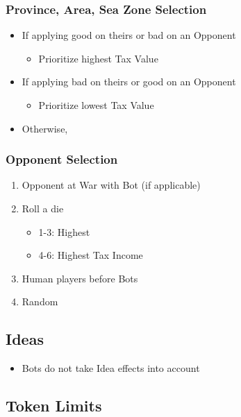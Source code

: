 \documentclass[10pt]{article}
\begin{document}
\subsubsection*{Province, Area, Sea Zone Selection}
\begin{itemize}
	\item If applying good on theirs or bad on an Opponent
	\begin{itemize}
		\item Prioritize highest Tax Value
	\end{itemize}
	\item If applying bad on theirs or good on an Opponent
	\begin{itemize}
		\item Prioritize lowest Tax Value
	\end{itemize}
	\item Otherwise, \az
\end{itemize}

\subsubsection*{Opponent Selection}
\begin{enumerate}
	\item Opponent at War with Bot (if applicable)
	\item Roll a die
	\begin{itemize}
		\item 1-3: Highest \prestige
		\item 4-6: Highest Tax Income
	\end{itemize}
	\item Human players before Bots
	\item Random	
\end{enumerate}

\subsection*{Ideas }
\begin{itemize}
	\item Bots do not take Idea effects into account
\end{itemize}

\subsection*{Token Limits }
\end{document}
